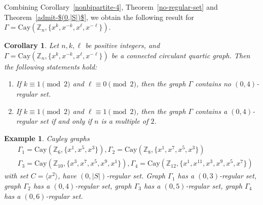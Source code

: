 \documentclass[12pt]{article}
\newtheorem{cor}[formula]{Corollary}
\newtheorem{example}[formula]{Example}
\begin{document}
Combining Corollary~\ref{nonbipartite-4}, Theorem~\ref{no-regular-set} and Theorem~\ref{admit-$(0,|S|)$}, we obtain the following result for $\Gamma = \mathrm{Cay}(\mathbb{Z}_n, \{x^k, x^{-k}, x^\ell, x^{-\ell}\})$.
\begin{cor}\label{$(0,4)$-regular set}
	Let $n, k, \ell$ be positive integers, and  $\Gamma = \mathrm{Cay}(\mathbb{Z}_n, \{x^k, x^{-k}, x^\ell, x^{-\ell}\})$ be a connected circulant quartic graph. Then the following statements hold:
	\begin{enumerate}
		\item[(i)] If $k \equiv 1 \pmod{2}$ and $\ell \equiv 0 \pmod{2}$, then the graph $\Gamma$ contains no $(0,4)$-regular set.
		\item[(ii)] If $k \equiv 1 \pmod{2}$ and $\ell \equiv 1 \pmod{2}$, then the graph $\Gamma$ contains a $(0,4)$-regular set if and only if $n$ is a multiple of $2$.
	\end{enumerate}	
	\end{cor}
\begin{example}\label{Cay-$(0,|S|)$}
Cayley graphs
\[
\begin{aligned}
   &\Gamma_1 = \mathrm{Cay}(\mathbb{Z}_6, \{x^1, x^5, x^3\}), \Gamma_2 = \mathrm{Cay}(\mathbb{Z}_8, \{x^1, x^7, x^5,  x^3\})\\
     &\Gamma_3 = \mathrm{Cay}(\mathbb{Z}_{10}, \{x^3, x^7, x^5, x^9,x^1\}), \Gamma_4 = \mathrm{Cay}(\mathbb{Z}_{12}, \{x^1, x^{11}, x^3, x^9, x^5, x^7\})
\end{aligned}
\]
 with set $C=\langle x^2 \rangle$, have $(0,|S|)$-regular set. Graph $\Gamma_1$ has a $(0,3)$-regular set, graph  $\Gamma_2$ has a $(0,4)$-regular set, graph  $\Gamma_3$ has a $(0,5)$-regular set, graph  $\Gamma_4$ has a $(0,6)$-regular set.
\end{example}
\end{document}
